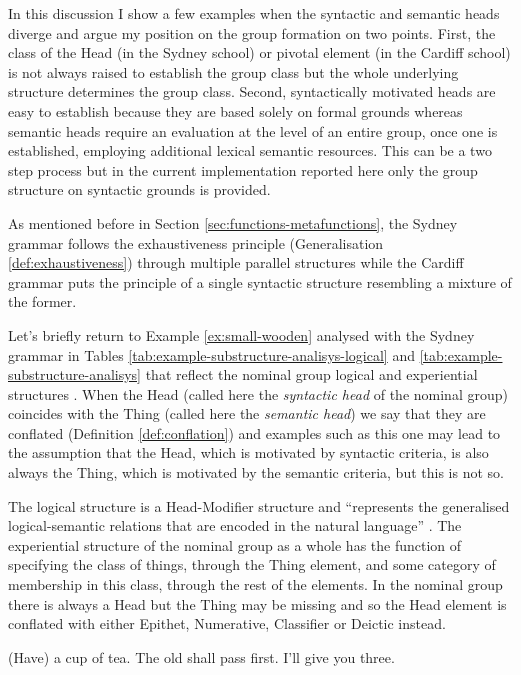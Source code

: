     In this discussion I show a few examples when the syntactic and semantic heads diverge and argue my position on the group formation on two points. First, the class of the Head (in the Sydney school) or pivotal element (in the Cardiff school) is not always raised to establish the group class but the whole underlying structure determines the group class. Second, syntactically motivated heads are easy to establish because they are based solely on formal grounds whereas semantic heads require an evaluation at the level of an entire group, once one is established, employing additional lexical semantic resources. This can be a two step process but in the current implementation reported here only the group structure on syntactic grounds is provided. 
    
    As mentioned before in Section \ref{sec:functions-metafunctions}, the Sydney grammar follows the exhaustiveness principle (Generalisation \ref{def:exhaustiveness}) through multiple parallel structures while the Cardiff grammar puts the principle of a single syntactic structure resembling a mixture of the former.

    Let's briefly return to Example \ref{ex:small-wooden} analysed with the Sydney grammar in Tables \ref{tab:example-substructure-analisys-logical} and \ref{tab:example-substructure-analisys} that reflect the nominal group logical and experiential structures \citep[391]{Halliday2013}. When the Head (called here the \textit{syntactic head} of the nominal group) coincides with the Thing (called here the \textit{semantic head}) we say that they are conflated (Definition \ref{def:conflation}) and examples such as this one may lead to the assumption that the Head, which is motivated by syntactic criteria, is also always the Thing, which is motivated by the semantic criteria, but this is not so.
    
    The logical structure is a Head-Modifier structure and ``represents the generalised logical-semantic relations that are encoded in the natural language'' \citep[388]{Halliday2013}. The experiential structure of the nominal group as a whole has the function of specifying the class of things, through the Thing element, and some category of membership in this class, through the rest of the elements. In the nominal group there is always a Head but the Thing may be missing and so the Head element is conflated with either Epithet, Numerative, Classifier or Deictic instead.
    
    \begin{exe}
    	\ex\label{ex:one} (Have) a cup of tea. 
       	\ex\label{ex:the-old-example} The old shall pass first.
    	\ex\label{ex:three} I'll give you three.
    \end{exe}
    
